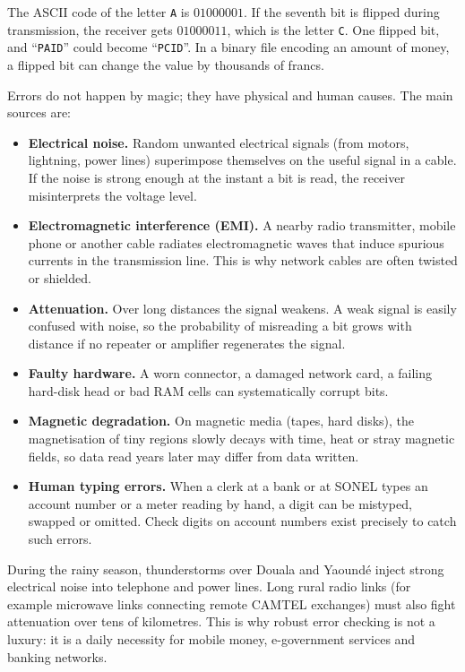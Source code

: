 \documentclass[11pt]{article}
\newcounter{popsec}
\newcounter{popsub}
\newcommand{\courssub}[1]{%
  \stepcounter{popsub}%
  \par\vspace{9pt}\noindent{\popxbold\fontsize{11.5}{13}\selectfont\color{popink}{\color{poporange}\thepopsec.\thepopsub}\hspace{6pt}#1}\par\nopagebreak\vspace{4pt}
}
\begin{document}
\begin{exemplebox}
The ASCII code of the letter \texttt{A} is $01000001$. If the seventh bit is flipped during transmission, the receiver gets $01000011$, which is the letter \texttt{C}. One flipped bit, and ``\texttt{PAID}'' could become ``\texttt{PCID}''. In a binary file encoding an amount of money, a flipped bit can change the value by thousands of francs.
\end{exemplebox}

\courssub{Sources of Errors}

Errors do not happen by magic; they have physical and human causes. The main sources are:

\begin{itemize}
\item \textbf{Electrical noise.} Random unwanted electrical signals (from motors, lightning, power lines) superimpose themselves on the useful signal in a cable. If the noise is strong enough at the instant a bit is read, the receiver misinterprets the voltage level.
\item \textbf{Electromagnetic interference (EMI).} A nearby radio transmitter, mobile phone or another cable radiates electromagnetic waves that induce spurious currents in the transmission line. This is why network cables are often twisted or shielded.
\item \textbf{Attenuation.} Over long distances the signal weakens. A weak signal is easily confused with noise, so the probability of misreading a bit grows with distance if no repeater or amplifier regenerates the signal.
\item \textbf{Faulty hardware.} A worn connector, a damaged network card, a failing hard-disk head or bad RAM cells can systematically corrupt bits.
\item \textbf{Magnetic degradation.} On magnetic media (tapes, hard disks), the magnetisation of tiny regions slowly decays with time, heat or stray magnetic fields, so data read years later may differ from data written.
\item \textbf{Human typing errors.} When a clerk at a bank or at SONEL types an account number or a meter reading by hand, a digit can be mistyped, swapped or omitted. Check digits on account numbers exist precisely to catch such errors.
\end{itemize}

\begin{savaistu}
During the rainy season, thunderstorms over Douala and Yaoundé inject strong electrical noise into telephone and power lines. Long rural radio links (for example microwave links connecting remote CAMTEL exchanges) must also fight attenuation over tens of kilometres. This is why robust error checking is not a luxury: it is a daily necessity for mobile money, e-government services and banking networks.
\end{savaistu}
\end{document}
